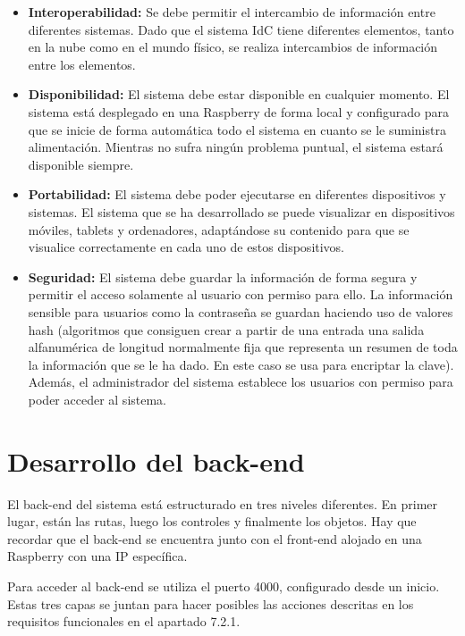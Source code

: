 \begin{itemize}
    \item \textbf{Interoperabilidad:} Se debe permitir el intercambio de información entre diferentes sistemas. Dado que el sistema IdC tiene diferentes elementos, tanto en la nube como en el mundo físico, se realiza intercambios de información entre los elementos.
    
    \item \textbf{Disponibilidad:} El sistema debe estar disponible en cualquier momento. El sistema está desplegado en una Raspberry de forma local y configurado para que se inicie de forma automática todo el sistema en cuanto se le suministra alimentación. Mientras no sufra ningún problema puntual, el sistema estará disponible siempre.
    
    \item \textbf{Portabilidad:} El sistema debe poder ejecutarse en diferentes dispositivos y sistemas. El sistema que se ha desarrollado se puede visualizar en dispositivos móviles, tablets y ordenadores, adaptándose su contenido para que se visualice correctamente en cada uno de estos dispositivos.
    
    \item \textbf{Seguridad:} El sistema debe guardar la información de forma segura y permitir el acceso solamente al usuario con permiso para ello. La información sensible para usuarios como la contraseña se guardan haciendo uso de valores hash (algoritmos que consiguen crear a partir de una entrada una salida alfanumérica de longitud normalmente fija que representa un resumen de toda la información que se le ha dado. En este caso se usa para encriptar la clave). Además, el administrador del sistema establece los usuarios con permiso para poder acceder al sistema.
\end{itemize}

\section{Desarrollo del back-end}
El back-end del sistema está estructurado en tres niveles diferentes. En primer lugar, están las rutas, luego los controles y finalmente los objetos. Hay que recordar que el back-end se encuentra junto con el front-end alojado en una Raspberry con una IP específica. 

Para acceder al back-end se utiliza el puerto 4000, configurado desde un inicio. Estas tres capas se juntan para hacer posibles las acciones descritas en los requisitos funcionales en el apartado 7.2.1.


